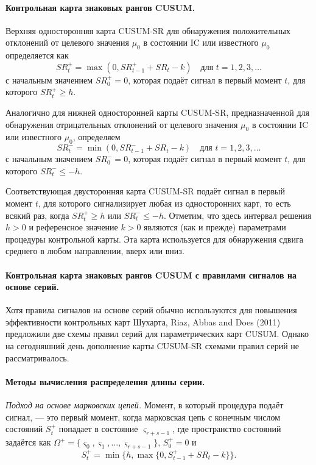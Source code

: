 \paragraph{Контрольная карта знаковых рангов CUSUM.} Верхняя односторонняя карта CUSUM-SR для обнаружения положительных отклонений от целевого значения \(\mu_0\) в состоянии IC или известного \(\mu_0\) определяется как
\begin{equation}
	SR_t^+ = \max(0, SR_{t-1}^+ + SR_t - k) \quad \text{для } t = 1, 2, 3, \ldots
	\label{eq:4.10}
\end{equation}
с начальным значением \(SR_0^+ = 0\), которая подаёт сигнал в первый момент \(t\), для которого \(SR_t^+ \ge h\).

Аналогично для нижней односторонней карты CUSUM-SR, предназначенной для обнаружения отрицательных отклонений от целевого значения \(\mu_0\) в состоянии IC или известного \(\mu_0\), определяем
\begin{equation}
	SR_t^- = \min(0, SR_{t-1}^- + SR_t - k) \quad \text{для } t = 1, 2, 3, \ldots
	\label{eq:4.11}
\end{equation}
с начальным значением \(SR_0^- = 0\), которая подаёт сигнал в первый момент \(t\), для которого \(SR_t^- \le -h\).

Соответствующая двусторонняя карта CUSUM-SR подаёт сигнал в первый момент \(t\), для которого сигнализирует любая из односторонних карт, то есть всякий раз, когда \(SR_t^+ \ge h\) или \(SR_t^- \le -h\). Отметим, что здесь интервал решения \(h > 0\) и референсное значение \(k > 0\) являются (как и прежде) параметрами процедуры контрольной карты. Эта карта используется для обнаружения сдвига среднего в любом направлении, вверх или вниз.

\paragraph{Контрольная карта знаковых рангов CUSUM с правилами сигналов на основе серий.} Хотя правила сигналов на основе серий обычно используются для повышения эффективности контрольных карт Шухарта, Riaz, Abbas and Does (2011) предложили две схемы правил серий для параметрических карт CUSUM. Однако на сегодняшний день дополнение карты CUSUM-SR схемами правил серий не рассматривалось.

\paragraph{Методы вычисления распределения длины серии.} \emph{Подход на основе марковских цепей.} Момент, в который процедура подаёт сигнал, --- это первый момент, когда марковская цепь с конечным числом состояний \(S_t^+\) попадает в состояние \(\varsigma_{r+s-1}\), где пространство состояний задаётся как \(\Omega^+ = \{\varsigma_0, \varsigma_1, \ldots, \varsigma_{r+s-1}\}\), \(S_0^+ = 0\) и
\begin{equation}
	S_t^+ = \min\{h, \max\{0, S_{t-1}^+ + SR_t - k\}\}.
	\label{eq:4.12}
\end{equation}

